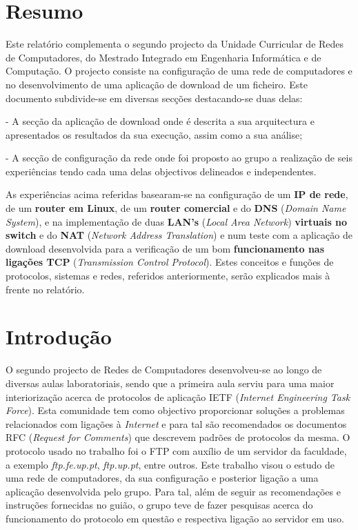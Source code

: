 \documentclass[a4paper]{article}
\begin{document}

\newpage

\section*{Resumo}
Este relatório complementa o segundo projecto da Unidade Curricular de Redes de Computadores, do Mestrado Integrado em Engenharia Informática e de Computação. O projecto consiste na configuração de uma rede de computadores e no desenvolvimento de uma aplicação de download de um ficheiro.
Este documento subdivide-se em diversas secções destacando-se duas delas:

- A secção da aplicação de download onde é descrita a sua arquitectura e apresentados os resultados da sua execução, assim como a sua análise; 

- A secção de configuração da rede onde foi proposto ao grupo a realização de seis experiências tendo cada uma delas objectivos delineados e independentes.\linebreak

As experiências acima referidas basearam-se na configuração de um \textbf{IP de rede}, de um \textbf{router em Linux}, de um \textbf{router comercial} e do \textbf{DNS} (\textit{Domain Name System}), e na implementação de duas \textbf{LAN's} (\textit{Local Area Network}) \textbf{virtuais no switch} e do \textbf{NAT} (\textit{Network Address Translation}) e num teste com a aplicação de download desenvolvida para a verificação de um bom \textbf{funcionamento nas ligações TCP} (\textit{Transmission Control Protocol}). Estes conceitos e funções de protocolos, sistemas e redes, referidos anteriormente, serão explicados mais à frente no relatório.

\newpage

\tableofcontents
\newpage

\section{Introdução}
O segundo projecto de Redes de Computadores desenvolveu-se ao longo de diversas aulas laboratoriais, sendo que a primeira aula serviu para uma maior interiorização acerca de protocolos de aplicação IETF (\textit{Internet Engineering Task Force}). Esta comunidade tem como objectivo proporcionar soluções a problemas relacionados com ligações à \textit{Internet} e para tal são recomendados os documentos RFC (\textit{Request for Comments}) que descrevem padrões de protocolos da mesma.
O protocolo usado no trabalho foi o FTP com auxílio de um servidor da faculdade, a exemplo \textit{ftp.fe.up.pt}, \textit{ftp.up.pt}, entre outros.
Este trabalho visou o estudo de uma rede de computadores, da sua configuração e posterior ligação a uma aplicação desenvolvida pelo grupo. Para tal, além de seguir as recomendações e instruções fornecidas no guião, o grupo teve de fazer pesquisas acerca do funcionamento do protocolo em questão e respectiva ligação ao servidor em uso.
\end{document}
